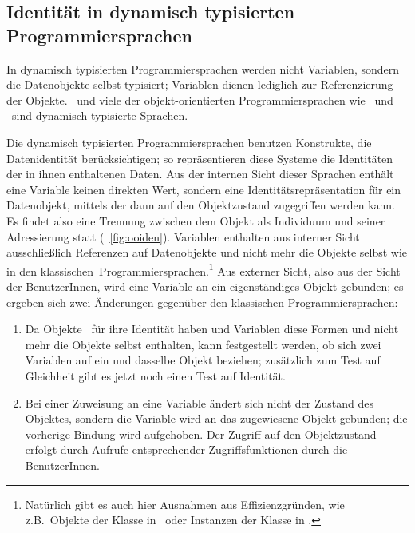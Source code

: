 \subsection{Identit\"{a}t in dynamisch typisierten Programmiersprachen}
%
In dynamisch typisierten Programmiersprachen werden nicht Variablen,
sondern die Datenobjekte selbst typisiert; Variablen dienen lediglich
zur Referenzierung der Objekte.  \cl\ und viele der
objekt-orientierten Programmiersprachen wie \smalltalk\ und
\clos\ sind dynamisch typisierte Sprachen.
%
\par{}Die dynamisch typisierten Programmiersprachen benutzen Konstrukte,
die Datenidentit\"{a}t be\-r\"{u}ck\-sich\-ti\-gen; so repr\"{a}sentieren diese
Systeme die Identit\"{a}ten der in ihnen enthaltenen Daten. Aus der
internen Sicht dieser Sprachen enth\"{a}lt eine Variable keinen direkten
Wert, sondern eine Identit\"{a}tsrepr\"{a}sentation f\"{u}r ein Datenobjekt,
mittels der dann auf den Objektzustand zugegriffen werden kann.  Es
findet also eine Trennung zwischen dem Objekt als Individuum und
seiner Adressierung statt (\figurename~\ref{fig:ooiden}). Variablen
enthalten aus interner Sicht ausschlie\ss{}lich Referenzen auf
Datenobjekte und nicht mehr die Objekte selbst wie in den
\rglq{}klassischen\rgrq\ Pro\-gram\-mier\-spra\-chen.\footnote{Nat\"{u}rlich
gibt es auch hier Ausnahmen aus Effizienzgr\"{u}nden, wie z.B.\ Objekte
der Klasse  in \smalltalk\ oder Instanzen der
Klasse  in \clos.} Aus externer Sicht, also aus der
Sicht der BenutzerInnen, wird eine Variable an ein
ei\-gen\-st\"{a}n\-di\-ges Objekt gebunden; es ergeben sich zwei
\"{A}nderungen gegen\"{u}ber den klassischen Programmiersprachen:
%
\begin{enumerate}
%
\item Da Objekte \representationforms\ f\"{u}r ihre Identit\"{a}t haben und
Variablen diese Formen und nicht mehr die Objekte selbst enthalten,
kann festgestellt werden, ob sich zwei Variablen auf ein und dasselbe
Objekt beziehen; zus\"{a}tzlich zum Test auf Gleichheit gibt es jetzt noch
einen Test auf Identit\"{a}t.
%
\item Bei einer Zuweisung an eine Variable \"{a}ndert sich nicht der
Zustand des Objektes, sondern die Variable wird an das zugewiesene
Objekt gebunden; die vorherige Bindung wird aufgehoben. Der Zugriff
auf den Objektzustand erfolgt durch Aufrufe entsprechender
Zugriffsfunktionen durch die BenutzerInnen.
%
\end{enumerate}
%
